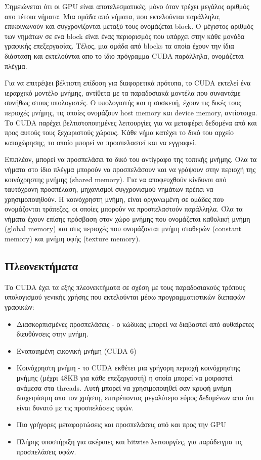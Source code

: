 Σημειώνεται ότι οι GPU είναι αποτελεσματικές, μόνο όταν τρέχει μεγάλος αριθμός απο τέτοια νήματα. Μια ομάδα από νήματα, που εκτελούνται παράλληλα, επικοινωνούν και συγχρονίζονται μεταξύ τους ονομάζεται block. Ο μέγιστος αριθμός των νημάτων σε ενα block είναι ένας περιορισμός που υπάρχει στην κάθε μονάδα γραφικής επεξεργασίας. Τέλος, μια ομάδα από blocks τα οποία έχουν την ίδια διάσταση και εκτελούνται απο το ίδιο πρόγραμμα CUDA παράλληλα, ονομάζεται πλέγμα.

Για να επιτρέψει βέλτιστη επίδοση για διαφορετικά πρότυπα, το CUDA εκτελεί ένα ιεραρχικό μοντέλο μνήμης, αντίθετα με τα παραδοσιακά μοντέλα που συναντάμε συνήθως στους υπολογιστές. Ο υπολογιστής και η συσκευή, έχουν τις δικές τους περιοχές μνήμης, τις οποίες ονομάζουν host memory και device memory, αντίστοιχα. Το CUDA παρέχει βελτιστοποιημένες λειτουργίες για να μεταφέρει δεδομένα από και προς αυτούς τους ξεχωριστούς χώρους.
Κάθε νήμα κατέχει το δικό του αρχείο καταχώρησης, το οποίο μπορεί να προσπελαστεί και να εγγραφεί.

Επιπλέον, μπορεί να προσπελάσει το δικό του αντίγραφο της τοπικής μνήμης. Όλα τα νήματα στο ίδιο πλέγμα μπορούν να προσπελάσουν και να γράψουν στην περιοχή της κοινόχρηστης μνήμης (shared memory). Για να αποφευχθούν κίνδυνοι από ταυτόχρονη προσπέλαση, μηχανισμοί συγχρονισμού νημάτων πρέπει να χρησιμοποιηθούν. Η κοινόχρηστη μνήμη, είναι οργανωμένη σε ομάδες που ονομάζονται τράπεζες, οι οποίες μπορούν να προσπελαστούν παράλληλα. Όλα τα νήματα έχουν επίσης πρόσβαση στον χώρο μνήμης που ονομάζεται καθολική μνήμη (global memory) και στις περιοχές που ονομάζονται μνήμη σταθερών (constant memory) και μνήμη υφής (texture memory).

\subsection{Πλεονεκτήματα}
Το CUDA έχει τα εξής πλεονεκτήματα σε σχέση με τους παραδοσιακούς τρόπους υπολογισμού γενικής χρήσης που εκτελούνται μέσω προγραμματιστικών διεπαφών γραφικών:
\begin{itemize}
\item Διασκορπισμένες προσπελάσεις - ο κώδικας μπορεί να διαβαστεί από αυθαίρετες διευθύνσεις στην μνήμη.
\item Ενοποιημένη εικονική μνήμη (CUDA 6)
\item Κοινόχρηστη μνήμη - το CUDA εκθέτει μια γρήγορη περιοχή κοινόχρηστης μνήμης (μέχρι 48KB για κάθε επεξεργαστή) η οποία μπορεί να μοιραστεί ανάμεσα στα threads. Αυτή μπορεί να χρησιμοποιηθεί σαν κρυφή μνήμη διαχειρίσιμη απο τον χρήστη, επιτρέποντας μεγαλύτερο εύρος δεδομένων απο ότι είναι δυνατό με τις προσπελάσεις υφών.
\item Πιο γρήγορες μεταφορτώσεις και προσπελάσεις από και προς την GPU
\item Πλήρης υποστήριξη για ακέραιες και bitwise λειτουργίες, για παράδειγμα τις προσπελάσεις υφών.
\end{itemize}
